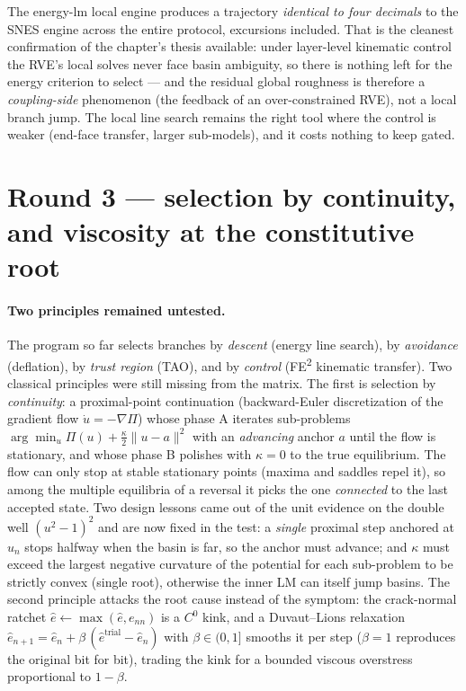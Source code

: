The energy-lm local engine produces a trajectory \emph{identical to
four decimals} to the SNES engine across the entire protocol,
excursions included. That is the cleanest confirmation of the
chapter's thesis available: under layer-level kinematic control the
RVE's local solves never face basin ambiguity, so there is nothing
left for the energy criterion to select --- and the residual global
roughness is therefore a \emph{coupling-side} phenomenon (the
feedback of an over-constrained RVE), not a local branch jump. The
local line search remains the right tool where the control is weaker
(end-face transfer, larger sub-models), and it costs nothing to keep
gated.

\section{Round 3 --- selection by continuity, and viscosity at the
constitutive root}
\label{sec:kb-round3}

\paragraph{Two principles remained untested.} The program so far
selects branches by \emph{descent} (energy line search), by
\emph{avoidance} (deflation), by \emph{trust region} (TAO), and by
\emph{control} (FE\textsuperscript{2} kinematic transfer). Two
classical principles were still missing from the matrix. The first is
selection by \emph{continuity}: a proximal-point continuation
(backward-Euler discretization of the gradient flow
$\dot{u} = -\nabla\Pi$) whose phase A iterates sub-problems
$\arg\min_u \Pi(u) + \tfrac{\kappa}{2}\lVert u - a\rVert^2$ with an
\emph{advancing} anchor $a$ until the flow is stationary, and whose
phase B polishes with $\kappa = 0$ to the true equilibrium. The flow
can only stop at stable stationary points (maxima and saddles repel
it), so among the multiple equilibria of a reversal it picks the one
\emph{connected} to the last accepted state. Two design lessons came
out of the unit evidence on the double well $(u^2-1)^2$ and are now
fixed in the test: a \emph{single} proximal step anchored at $u_n$
stops halfway when the basin is far, so the anchor must advance; and
$\kappa$ must exceed the largest negative curvature of the potential
for each sub-problem to be strictly convex (single root), otherwise
the inner LM can itself jump basins. The second principle attacks the
root cause instead of the symptom: the crack-normal ratchet
$\hat{e} \leftarrow \max(\hat{e}, e_{nn})$ is a $C^0$ kink, and a
Duvaut--Lions relaxation
$\hat{e}_{n+1} = \hat{e}_n + \beta\,(\hat{e}^{\mathrm{trial}} -
\hat{e}_n)$ with $\beta \in (0,1]$ smooths it per step ($\beta = 1$
reproduces the original bit for bit), trading the kink for a bounded
viscous overstress proportional to $1-\beta$.

